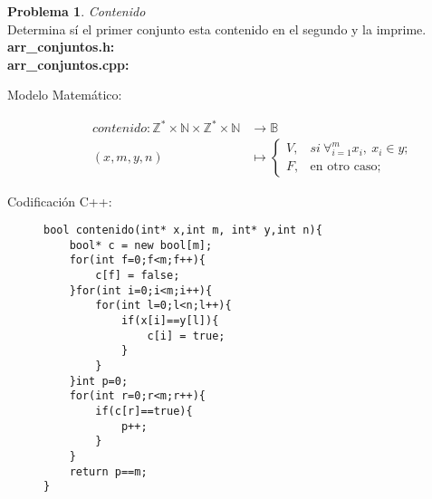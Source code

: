 \documentclass{article}
\theoremstyle{plain}
\theoremstyle{definition}
\newtheorem{problem}{Problema}
\begin{document}
\begin{problem} \emph{Contenido}\\
Determina sí el primer conjunto esta contenido en el segundo y la imprime.\\
\textbf{arr\_conjuntos.h:}\ \\
\textbf{arr\_conjuntos.cpp:}\ 
%
\begin{description}
\item[Modelo Matemático:]
%
\begin{align*}
contenido: \mathbb{Z}^*\times\mathbb{N}\times\mathbb{Z}^*\times\mathbb{N} &\to \mathbb{B}\\
(x,m,y,n) &\mapsto
\begin{cases}
V,& si\ \forall_{i=1}^m x_i,\ x_i \in y;\\
F,& \text{en otro caso;}
\end{cases}
\end{align*}
%
\item[Codificación \textsf{C++}:]\hfill
%
\begin{verbatim}
bool contenido(int* x,int m, int* y,int n){
    bool* c = new bool[m];
    for(int f=0;f<m;f++){
        c[f] = false;
    }for(int i=0;i<m;i++){
        for(int l=0;l<n;l++){
            if(x[i]==y[l]){
                c[i] = true;
            }
        }
    }int p=0;
    for(int r=0;r<m;r++){
        if(c[r]==true){
            p++;
        }
    }
    return p==m;
}
\end{verbatim}
\end{description}
\end{problem}
\end{document}
